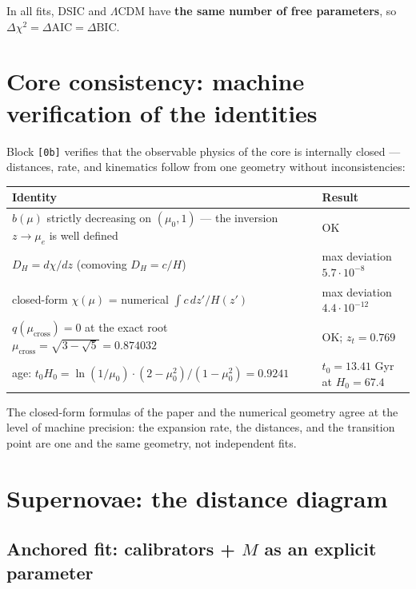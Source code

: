 \documentclass[a4paper,10pt]{article}
\begin{document}
In all fits, DSIC and $\Lambda$CDM have \textbf{the same number of free parameters}, so $\Delta\chi^2 = \Delta\text{AIC} = \Delta\text{BIC}$.

\clearpage

\section{Core consistency: machine verification of the identities}

Block \texttt{[0b]} verifies that the observable physics of the core is internally closed --- distances, rate, and kinematics follow from one geometry without inconsistencies:

\begin{table}[htbp]
\centering
\small
\begin{tabular}{@{}p{9.5cm}p{5.5cm}@{}}
\toprule
\textbf{Identity} & \textbf{Result} \\
\midrule
$b(\mu)$ strictly decreasing on $(\mu_0, 1)$ --- the inversion $z \to \mu_e$ is well defined & OK \\
$D_H = d\chi/dz$ (comoving $D_H = c/H$) & max deviation $5.7{\cdot}10^{-8}$ \\
closed-form $\chi(\mu)$ = numerical $\int c\, dz'/H(z')$ & max deviation $4.4{\cdot}10^{-12}$ \\
$q(\mu_{\text{cross}}) = 0$ at the exact root $\mu_{\text{cross}} = \sqrt{3-\sqrt{5}} = 0.874032$ & OK; $z_t = 0.769$ \\
age: $t_0 H_0 = \ln(1/\mu_0)\cdot(2-\mu_0^2)/(1-\mu_0^2) = 0.9241$ & $t_0 = 13.41$ Gyr at $H_0 = 67.4$ \\
\bottomrule
\end{tabular}
\end{table}

The closed-form formulas of the paper and the numerical geometry agree at the level of machine precision: the expansion rate, the distances, and the transition point are one and the same geometry, not independent fits.

\section{Supernovae: the distance diagram}

\subsection{Anchored fit: calibrators + $M$ as an explicit parameter}
\end{document}
